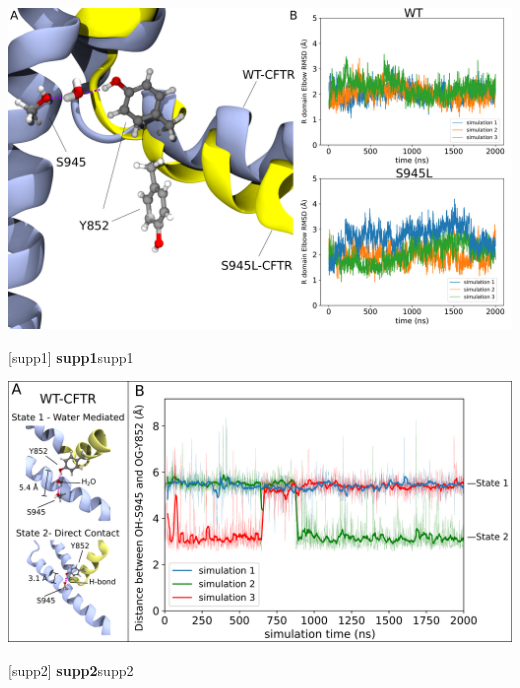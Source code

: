 \begin{center}
	\includegraphics[width=\textwidth]{figures/S945L/Supp1_MD.pdf}
\end{center}
	\captionsetup{singlelinecheck = false, justification=raggedright}
\begingroup
{}[supp1] {\textbf{supp1}}{supp1}
\label{S945L_MD_1}
\endgroup

\begin{center}
	\includegraphics[width=\textwidth]{figures/S945L/Supp2_MD.pdf}
\end{center}
\captionsetup{singlelinecheck = false, justification=raggedright}
\begingroup
{}[supp2] {\textbf{supp2}}{supp2}
\label{S945L_MD_2}
\endgroup
